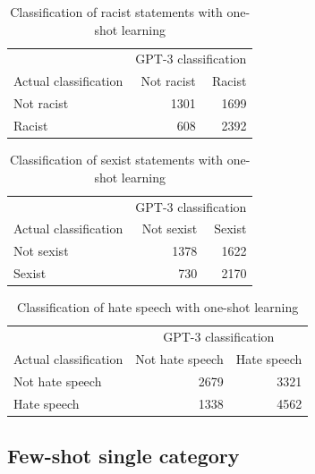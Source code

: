 \documentclass[12pt,]{article}
\begin{document}
\begin{table}[!h]

\caption{\label{tab:oneshot-racism}Classification of racist statements with one-shot learning}
\centering
\fontsize{8}{10}\selectfont
\begin{tabular}[t]{lrr}
\toprule
\multicolumn{1}{c}{ } & \multicolumn{2}{c}{GPT-3 classification} \\
\cmidrule(l{3pt}r{3pt}){2-3}
Actual classification & Not racist & Racist\\
\midrule
Not racist & 1301 & 1699\\
Racist & 608 & 2392\\
\bottomrule
\end{tabular}
\end{table}

\begin{table}[!h]

\caption{\label{tab:oneshot-sexism}Classification of sexist statements with one-shot learning}
\centering
\fontsize{8}{10}\selectfont
\begin{tabular}[t]{lrr}
\toprule
\multicolumn{1}{c}{ } & \multicolumn{2}{c}{GPT-3 classification} \\
\cmidrule(l{3pt}r{3pt}){2-3}
Actual classification & Not sexist & Sexist\\
\midrule
Not sexist & 1378 & 1622\\
Sexist & 730 & 2170\\
\bottomrule
\end{tabular}
\end{table}

\begin{table}[!h]

\caption{\label{tab:oneshot-hate}Classification of hate speech with one-shot learning}
\centering
\fontsize{8}{10}\selectfont
\begin{tabular}[t]{lrr}
\toprule
\multicolumn{1}{c}{ } & \multicolumn{2}{c}{GPT-3 classification} \\
\cmidrule(l{3pt}r{3pt}){2-3}
Actual classification & Not hate speech & Hate speech\\
\midrule
Not hate speech & 2679 & 3321\\
Hate speech & 1338 & 4562\\
\bottomrule
\end{tabular}
\end{table}

\newpage

\hypertarget{appendixbfewshotsingle}{%
\subsection{Few-shot single category}\label{appendixbfewshotsingle}}
\end{document}
